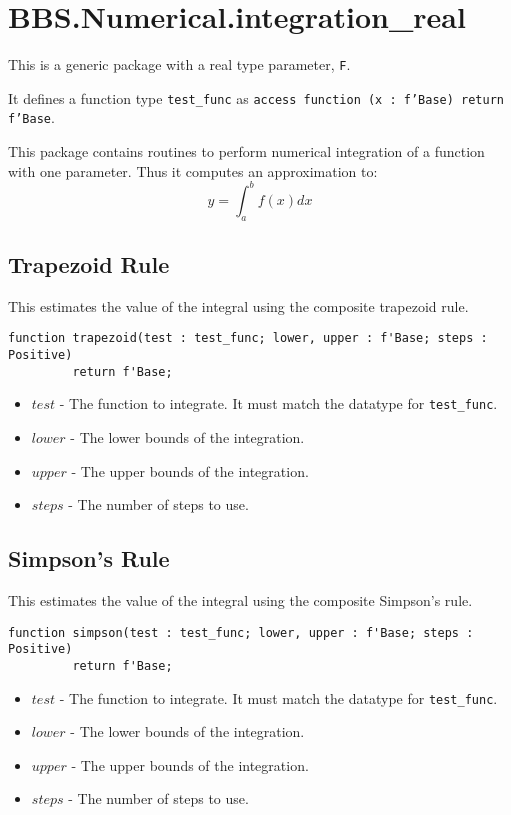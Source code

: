 \documentclass[10pt, openany]{book}
\newcommand{\datatype}[1]{\texttt{#1}}
\begin{document}
\section{BBS.Numerical.integration\_real}
This is a generic package with a real type parameter, \datatype{F}.

It defines a function type \datatype{test\_func} as \datatype{access function (x : f'Base) return f'Base}.

This package contains routines to perform numerical integration of a function with one parameter.  Thus it computes an approximation to:
\begin{displaymath}
  y = \int_a^b f(x) dx
\end{displaymath}

\subsection{Trapezoid Rule}
This estimates the value of the integral using the composite trapezoid rule.
\begin{lstlisting}
function trapezoid(test : test_func; lower, upper : f'Base; steps : Positive)
         return f'Base;
\end{lstlisting}
\begin{itemize}
  \item $test$ - The function to integrate.  It must match the datatype for \datatype{test\_func}.
  \item $lower$ - The lower bounds of the integration.
  \item $upper$ - The upper bounds of the integration.
  \item $steps$ - The number of steps to use.
\end{itemize}

\subsection{Simpson's Rule}
This estimates the value of the integral using the composite Simpson's rule.
\begin{lstlisting}
function simpson(test : test_func; lower, upper : f'Base; steps : Positive)
         return f'Base;
\end{lstlisting}
\begin{itemize}
  \item $test$ - The function to integrate.  It must match the datatype for \datatype{test\_func}.
  \item $lower$ - The lower bounds of the integration.
  \item $upper$ - The upper bounds of the integration.
  \item $steps$ - The number of steps to use.
\end{itemize}
\end{document}
